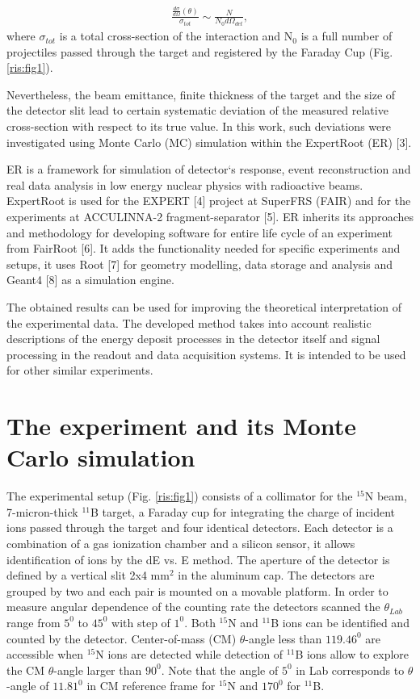 \documentclass[%
 aip,
cp,  %
 amsmath,amssymb,%
 reprint,%
]{revtex4-2}
\begin{document}
\begin{eqnarray}
 \frac{ \frac{d\sigma}{d\Omega}(\theta) }{\sigma_{tot}} \sim \frac{N}{N_0 d\Omega_{det}},
\end{eqnarray}
where
$\sigma$$_{tot}$ is a total cross-section of the interaction
and N$_{0}$ is a full number of projectiles passed through the target and registered by the Faraday Cup (Fig. \ref{ris:fig1}).

Nevertheless, the beam emittance, finite thickness of the target and the size of the detector slit lead to certain systematic deviation of the measured relative cross-section with respect to its true value. In this work, such deviations were investigated using Monte Carlo (MC) simulation within the ExpertRoot (ER) [3].

ER is a framework for simulation of detector`s response, event reconstruction and real data analysis in low energy nuclear physics with radioactive beams. ExpertRoot is used for the EXPERT [4] project at SuperFRS (FAIR) and for the experiments at ACCULINNA-2 fragment-separator [5].  ER inherits its approaches and methodology for developing software for entire life cycle of an experiment from FairRoot [6]. It adds the functionality needed for specific experiments and setups, it uses Root [7] for geometry modelling, data storage and analysis and Geant4 [8] as a simulation engine.

The obtained results can be used for improving the theoretical interpretation of the experimental data. The developed method takes into account realistic descriptions of the energy deposit processes in the detector itself and signal processing in the readout and data acquisition systems. It is intended to be used for other similar experiments.

\section{The experiment and its Monte Carlo simulation}

The experimental setup (Fig. \ref{ris:fig1}) consists of a collimator
for the ${}^{15}$N beam, 7-micron-thick ${}^{11}$B target, a Faraday cup
for integrating the charge of incident ions passed through the target
and four identical detectors. Each detector is a combination of a gas
ionization chamber and a silicon sensor, it allows identification of
ions by the dE vs. E method. The aperture of the detector is defined by
a vertical slit 2x4 mm$^2$ in the aluminum cap. The detectors are
grouped by two and each pair is mounted on a movable platform. In order
to measure angular dependence of the counting rate the detectors scanned
the $\theta_{Lab}$ range  from $5 ^0$ to $45 ^0$ with step of $1^0$.
Both ${}^{15}$N and ${}^{11}$B ions can be identified and counted by the
detector. Center-of-mass (CM) $\theta$-angle less than $119.46^0$  are
accessible when ${}^{15}$N ions are detected while detection of
${}^{11}$B ions allow to explore the CM $\theta$-angle larger than
$90^0$. Note that the angle of $5 ^0$ in Lab corresponds to
$\theta$-angle of ${11.81}^0$ in CM reference frame for $^{15}$N and
${170}^0$ for $^{11}$B.
\end{document}
